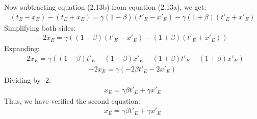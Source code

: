 \documentclass[12pt]{book}
\begin{document}
Now subtracting equation (2.13b) from equation (2.13a), we get:
\begin{align}
(t_E - x_E) - (t_E + x_E) = \gamma (1 - \beta)(t'_E - x'_E) - \gamma (1 + \beta)(t'_E + x'_E)
\end{align}
Simplifying both sides:
\begin{align}
-2x_E = \gamma \left( (1 - \beta)(t'_E - x'_E) - (1 + \beta)(t'_E + x'_E) \right)
\end{align}
Expanding:
\begin{align}
-2x_E = \gamma \left( (1 - \beta)t'_E - (1 - \beta)x'_E - (1 + \beta)t'_E - (1 + \beta)x'_E \right)
\end{align}
\begin{align}
-2x_E = \gamma \left( -2\beta t'_E - 2x'_E \right)
\end{align}
Dividing by -2:
\begin{align}
x_E = \gamma \beta t'_E + \gamma x'_E
\end{align}
Thus, we have verified the second equation:
\begin{align}
x_E = \gamma \beta t'_E + \gamma x'_E
\end{align}
\end{document}
